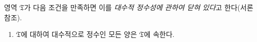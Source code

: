 
영역 $\mathfrak T$가 다음 조건을 만족하면 이를 \emph{대수적 정수성에 관하여 닫혀 있다}고 한다(서론 참조).
\begin{enumerate}
\item[V.] $\mathfrak T$에 대하여 대수적으로 정수인 모든 양은 $\mathfrak T$에 속한다.
\end{enumerate}
